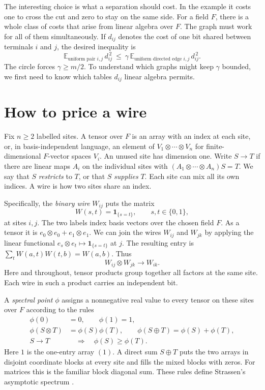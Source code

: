 \documentclass[11pt]{article}
\theoremstyle{definition}
\newcommand{\E}{\mathbb E}
\newcommand{\one}{\mathbf 1}
\newcommand{\res}{\longrightarrow}
\begin{document}
The interesting choice is what a separation should cost. In the example it
costs one to cross the cut and zero to stay on the same side. For a field
\(F\), there is a whole class of costs that arise from linear algebra over
\(F\). The graph must work for all of them simultaneously. If \(d_{ij}\)
denotes the cost of one bit shared between terminals \(i\) and \(j\), the
desired inequality is
\[
    \E_{\text{uniform pair }i,j}\,d_{ij}^{\,2}
    \ \le\ \gamma\,\E_{\text{uniform directed edge }i,j}\,d_{ij}^{\,2}.
\]
The circle forces \(\gamma\ge m/2\). To understand which graphs might
keep \(\gamma\) bounded, we first need to know which tables \(d_{ij}\)
linear algebra permits.

\section{How to price a wire}
\label{sec:prices}

Fix \(n\ge2\) labelled sites. A tensor over \(F\) is an array with an index
at each site, or, in basis-independent language, an element of
\(V_1\otimes\cdots\otimes V_n\) for finite-dimensional \(F\)-vector spaces
\(V_i\). An unused site has dimension one. Write \(S\res T\) if there are
linear maps \(A_i\) on the individual sites with
\((A_1\otimes\cdots\otimes A_n)S=T\). We say that \(S\) \emph{restricts}
to \(T\), or that \(S\) \emph{supplies} \(T\). Each site can mix all its own
indices. A wire is how two sites share an index.

Specifically, the \emph{binary wire} \(W_{ij}\) puts the matrix
\[
                 W(s,t)=\one_{\{s=t\}},\qquad s,t\in\{0,1\},
\]
at sites \(i,j\). The two labels index basis vectors over the chosen field
\(F\). As a tensor it is \(e_0\otimes e_0+e_1\otimes e_1\).
We can join the wires \(W_{ij}\) and \(W_{jk}\) by applying the linear
functional \(e_s\otimes e_t\mapsto\one_{\{s=t\}}\) at \(j\). The resulting
entry is \(\sum_t W(a,t)W(t,b)=W(a,b)\). Thus
\begin{equation}
                  W_{ij}\otimes W_{jk}\res W_{ik}.
                  \label{eq:splice}
\end{equation}
Here and throughout, tensor products group together all factors at the same
site. Each wire in such a product carries an independent bit.

A \emph{spectral point} \(\phi\) assigns a nonnegative real value to every
tensor on these sites over \(F\) according to the rules
\begin{align*}
 \phi(0)&=0,\qquad \phi(1)=1,\\
 \phi(S\otimes T)&=\phi(S)\phi(T),\qquad
 \phi(S\oplus T)=\phi(S)+\phi(T),\\
 S\res T&\quad\Longrightarrow\quad \phi(S)\ge\phi(T).
\end{align*}
Here \(1\) is the one-entry array \((1)\). A direct sum \(S\oplus T\) puts
the two arrays in disjoint coordinate blocks at every site and fills the
mixed blocks with zeros. For matrices this is the familiar block diagonal
sum. These rules define Strassen's asymptotic spectrum \cite{strassen-spectrum}.
\end{document}
